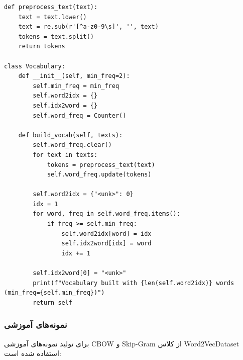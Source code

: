 \documentclass[12pt,a4paper]{article}
\begin{document}
\begin{lstlisting}[caption=کد پیش‌پردازش]
def preprocess_text(text):
    text = text.lower()
    text = re.sub(r'[^a-z0-9\s]', '', text)
    tokens = text.split()
    return tokens

class Vocabulary:
    def __init__(self, min_freq=2):
        self.min_freq = min_freq
        self.word2idx = {}
        self.idx2word = {}
        self.word_freq = Counter()

    def build_vocab(self, texts):
        self.word_freq.clear()
        for text in texts:
            tokens = preprocess_text(text)
            self.word_freq.update(tokens)

        self.word2idx = {"<unk>": 0}
        idx = 1
        for word, freq in self.word_freq.items():
            if freq >= self.min_freq:
                self.word2idx[word] = idx
                self.idx2word[idx] = word
                idx += 1

        self.idx2word[0] = "<unk>"
        print(f"Vocabulary built with {len(self.word2idx)} words (min_freq={self.min_freq})")
        return self
\end{lstlisting}

\subsubsection{نمونه‌های آموزشی}
برای تولید نمونه‌های آموزشی CBOW و Skip-Gram از کلاس Word2VecDataset استفاده شده است:
\end{document}
